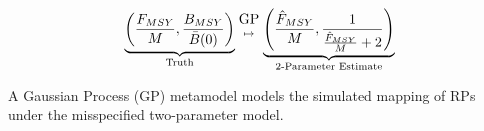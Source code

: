 \documentclass[a0paper,portrait]{baposter}
\begin{document}
\begin{poster}
{	\begin{equation*}
	\underbrace{\left(\frac{F_{MSY}}{M}, \frac{B_{MSY}}{\bar B(0)}\right)}_{\text{Truth}} {\text{GP}\atop{\mapsto\atop~}} \underbrace{\left(\frac{\hat F_{MSY}}{M}, \frac{1}{\frac{\hat F_{MSY}}{M}+2}\right)}_{\text{2-Parameter Estimate}}%
	\end{equation*}


	A Gaussian Process (GP) metamodel models the simulated mapping of RPs under the misspecified two-parameter model. 

}


\end{poster}
\end{document}
